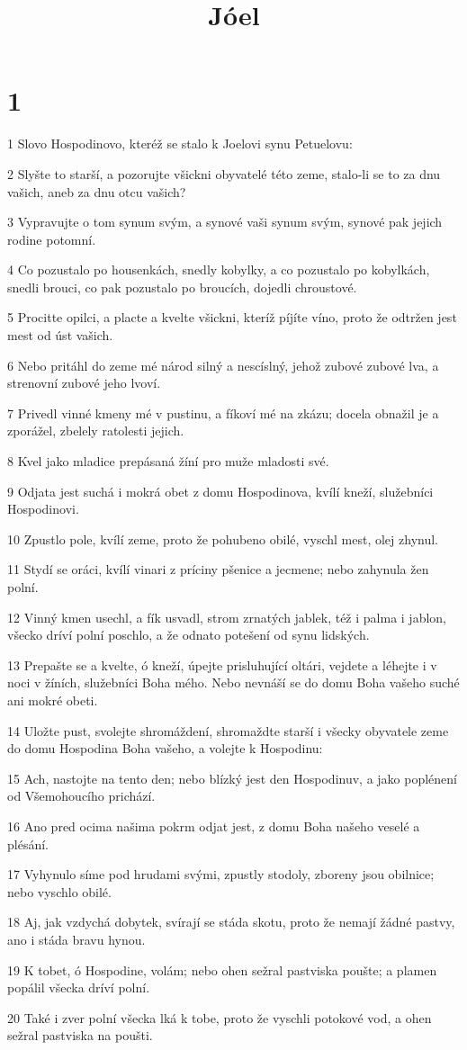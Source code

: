 

\title{Jóel}

\chapter{1}

\par 1 Slovo Hospodinovo, kteréž se stalo k Joelovi synu Petuelovu:
\par 2 Slyšte to starší, a pozorujte všickni obyvatelé této zeme, stalo-li se to za dnu vašich, aneb za dnu otcu vašich?
\par 3 Vypravujte o tom synum svým, a synové vaši synum svým, synové pak jejich rodine potomní.
\par 4 Co pozustalo po housenkách, snedly kobylky, a co pozustalo po kobylkách, snedli brouci, co pak pozustalo po broucích, dojedli chroustové.
\par 5 Procitte opilci, a placte a kvelte všickni, kteríž píjíte víno, proto že odtržen jest mest od úst vašich.
\par 6 Nebo pritáhl do zeme mé národ silný a nescíslný, jehož zubové zubové lva, a strenovní zubové jeho lvoví.
\par 7 Privedl vinné kmeny mé v pustinu, a fíkoví mé na zkázu; docela obnažil je a zporážel, zbelely ratolesti jejich.
\par 8 Kvel jako mladice prepásaná žíní pro muže mladosti své.
\par 9 Odjata jest suchá i mokrá obet z domu Hospodinova, kvílí kneží, služebníci Hospodinovi.
\par 10 Zpustlo pole, kvílí zeme, proto že pohubeno obilé, vyschl mest, olej zhynul.
\par 11 Stydí se oráci, kvílí vinari z príciny pšenice a jecmene; nebo zahynula žen polní.
\par 12 Vinný kmen usechl, a fík usvadl, strom zrnatých jablek, též i palma i jablon, všecko dríví polní poschlo, a že odnato potešení od synu lidských.
\par 13 Prepašte se a kvelte, ó kneží, úpejte prisluhující oltári, vejdete a léhejte i v noci v žíních, služebníci Boha mého. Nebo nevnáší se do domu Boha vašeho suché ani mokré obeti.
\par 14 Uložte pust, svolejte shromáždení, shromaždte starší i všecky obyvatele zeme do domu Hospodina Boha vašeho, a volejte k Hospodinu:
\par 15 Ach, nastojte na tento den; nebo blízký jest den Hospodinuv, a jako poplénení od Všemohoucího prichází.
\par 16 Ano pred ocima našima pokrm odjat jest, z domu Boha našeho veselé a plésání.
\par 17 Vyhynulo síme pod hrudami svými, zpustly stodoly, zboreny jsou obilnice; nebo vyschlo obilé.
\par 18 Aj, jak vzdychá dobytek, svírají se stáda skotu, proto že nemají žádné pastvy, ano i stáda bravu hynou.
\par 19 K tobet, ó Hospodine, volám; nebo ohen sežral pastviska poušte; a plamen popálil všecka dríví polní.
\par 20 Také i zver polní všecka lká k tobe, proto že vyschli potokové vod, a ohen sežral pastviska na poušti.

